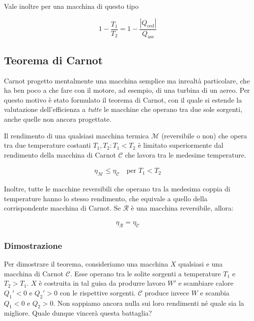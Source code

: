 Vale inoltre per una macchina di questo tipo

\[ 1 - \frac{T_1}{T_2} = 1 - \frac{|Q_\text{ced}|}{Q_\text{ass}} \]




\subsection{Teorema di Carnot}
Carnot progetto mentalmente una macchina semplice ma inrealtà
particolare, che ha ben poco a che fare con il motore, ad esempio,
di una turbina di un aereo. Per questo motivo è stato formulato
il teorema di Carnot, con il quale si estende la valutazione
dell'efficienza a \textit{tutte} le macchine che operano tra due
sole sorgenti, anche quelle non ancora progettate.


\begin{tcolorbox}[colback = red!30, colframe = red!30!black, title = {Teorema di Carnot}]
Il rendimento di una qualsiasi macchina termica $\mathcal{M}$ (reversibile o non)
che opera tra due
temperature costanti $T_1,T_2: T_1 < T_2$ è limitato superiormente dal rendimento della
macchina di Carnot $\mathcal{C}$ che lavora tra le medesime temperature.

\begin{align}
    \eta_\mathcal{M} \leq \eta_\mathcal{C} \quad \text{per } T_1 < T_2\label{carnot1}
\end{align}

Inoltre, tutte le macchine reversibili che operano tra la medesima coppia di temperature
hanno lo stesso rendimento, che equivale a quello della corrispondente macchina di
Carnot. Se $\mathcal{R}$ è una macchina reversibile, allora:

\begin{align}
    \eta_\mathcal{R} = \eta_\mathcal{C}\label{carnot2}
\end{align}

\end{tcolorbox}


\subsubsection*{Dimostrazione}
Per dimostrare il teorema, consideriamo una macchina $X$ qualsiasi
e una macchina di Carnot $\mathcal{C}$. Esse operano tra le solite
sorgenti a temperature $T_1$ e $T_2 > T_1$.
$X$ è costruita in tal guisa da produrre lavoro $W'$ e scambiare
calore $Q_1' < 0$ e $Q_2' > 0$ con le rispettive sorgenti. $\mathcal{C}$
produce invece $W$ e scambia $Q_1 < 0$ e $Q_2 > 0$.
Non sappiamo ancora nulla sui loro rendimenti né quale sia la migliore.
Quale dunque vincerà questa battaglia?

